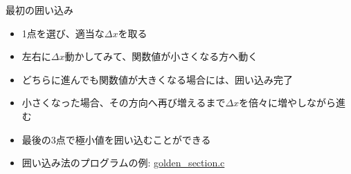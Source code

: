 \begin{frame}[t,fragile]{最初の囲い込み}
  \begin{itemize}
  \item 1点を選び、適当な$\Delta x$を取る
  \item 左右に$\Delta x$動かしてみて、関数値が小さくなる方へ動く
  \item どちらに進んでも関数値が大きくなる場合には、囲い込み完了
  \item 小さくなった場合、その方向へ再び増えるまで$\Delta x$を倍々に増やしながら進む
  \item 最後の3点で極小値を囲い込むことができる
  \item 囲い込み法のプログラムの例: \href{https://github.com/todo-group/computer-experiments/blob/master/exercise/optimization/golden_section.c}{golden\_section.c}
  \end{itemize}
\end{frame}
